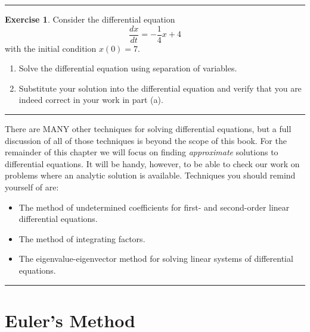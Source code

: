 \documentclass[
]{book}
\providecommand{\tightlist}{%
  \setlength{\itemsep}{0pt}\setlength{\parskip}{0pt}}
\theoremstyle{definition}
\theoremstyle{definition}
\theoremstyle{definition}
\newtheorem{exercise}{Exercise}[chapter]
\theoremstyle{remark}
\begin{document}
\begin{center}\rule{0.5\linewidth}{0.5pt}\end{center}

\begin{exercise}
\protect\hypertarget{exr:unnamed-chunk-422}{}{\label{exr:unnamed-chunk-422} }Consider the differential equation \[\frac{dx}{dt} = -\frac{1}{4} x + 4\] with the initial condition \(x(0) = 7\).

\begin{enumerate}
\def\labelenumi{\alph{enumi}.}
\tightlist
\item
  Solve the differential equation using separation of variables.
\item
  Substitute your solution into the differential equation and verify
  that you are indeed correct in your work in part (a).
\end{enumerate}
\end{exercise}

\begin{center}\rule{0.5\linewidth}{0.5pt}\end{center}

There are MANY other techniques for solving differential equations, but a full discussion of all of those techniques is beyond the scope of this book. For the remainder of this chapter we will focus on finding \emph{approximate} solutions to differential equations. It will be handy, however, to be able to check our work on problems where an analytic solution is available. Techniques you should remind yourself of are:

\begin{itemize}
\tightlist
\item
  The method of undetermined coefficients for first- and second-order linear differential equations.
\item
  The method of integrating factors.
\item
  The eigenvalue-eigenvector method for solving linear systems of differential equations.
\end{itemize}

\begin{center}\rule{0.5\linewidth}{0.5pt}\end{center}

\hypertarget{eulers-method}{%
\section{Euler's Method}\label{eulers-method}}
\end{document}
